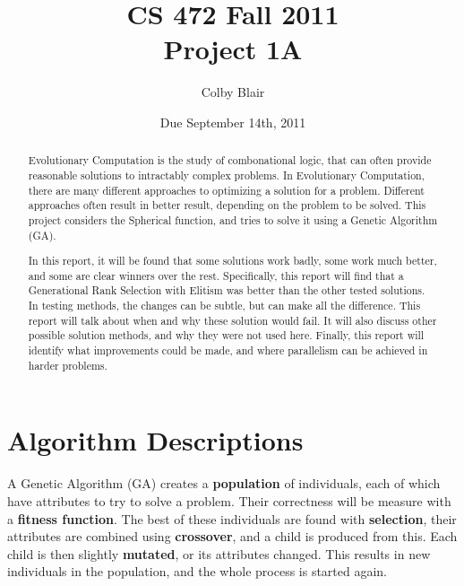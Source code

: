 \documentclass[12pt]{article}
\title{CS 472 Fall 2011 \\
     Project 1A}
\author{Colby Blair}
\date{Due September 14th, 2011}
\begin{document}
\maketitle

\begin{abstract}
Evolutionary Computation is the study of combonational logic, that can often provide reasonable solutions to
intractably complex problems. In Evolutionary Computation, there are many different approaches to optimizing a solution for a problem. Different approaches often result in better result, depending on the problem to be solved. This project considers the Spherical function, and tries to solve it using a Genetic Algorithm (GA).

In this report, it will be found that some solutions work badly, some work much better, and some are clear winners over the rest. Specifically, this report will find that a Generational Rank Selection with Elitism was better than the other tested solutions. In testing methods, the changes can be subtle, but can make all the difference. This report will talk about when and why these solution would fail. It will also discuss other possible solution methods, and why they were not used here. Finally, this report will identify what 
improvements could be made, and where parallelism can be achieved in harder problems.
\end{abstract}
\pagebreak

\part{Algorithm Descriptions}
\label{part:alg_desc}

A Genetic Algorithm (GA) creates a \textbf{population} of individuals, each of which have attributes to try to solve a problem. Their correctness will be measure with a \textbf{fitness function}. The best of these individuals are found with \textbf{selection}, their attributes are combined using \textbf{crossover}, and a child is produced from this. Each child is then slightly \textbf{mutated}, or its attributes changed. This results in new individuals in the population, and the whole process is started again.
\end{document}
